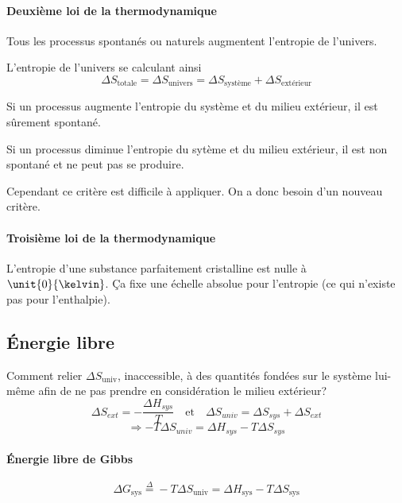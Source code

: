\documentclass[11pt,a4paper,french]{article}
\newcommand\eqdef{\stackrel{\Delta}{=}}
\begin{document}
\paragraph{Deuxième loi de la thermodynamique}
Tous les processus spontanés ou naturels augmentent l'entropie de l'univers.

L'entropie de l'univers se calculant ainsi
\[ \Delta S_\mathrm{totale} = \Delta S_\mathrm{univers} = \Delta S_{\textrm{système}} + \Delta S_{\textrm{extérieur}} \]

Si un processus augmente l'entropie du système et du milieu extérieur, il est sûrement spontané.

Si un processus diminue l'entropie du sytème et du milieu extérieur, il est non spontané et ne peut pas se produire.


Cependant ce critère est difficile à appliquer.
On a donc besoin d'un nouveau critère.

\paragraph{Troisième loi de la thermodynamique}
L'entropie d'une substance parfaitement cristalline est nulle à $\unit{0}{\kelvin}$.
\c{C}a fixe une échelle absolue pour l'entropie (ce qui n'existe pas pour l'enthalpie).



\subsection{\'Energie libre}
Comment relier $\Delta S_\mathrm{univ}$, inaccessible, à des quantités fondées sur le système lui-même afin de ne pas prendre en considération le milieu extérieur?
\[ \Delta S_{ext}=-\frac{\Delta H_{sys}}{T}
\quad\mathrm{et}\quad
\Delta S_{univ}=\Delta S_{sys}+\Delta S_{ext} \]
$$\Rightarrow -T\Delta S_{univ}=\Delta H_{sys}-T\Delta S_{sys}$$

\paragraph{\'Energie libre de Gibbs}
\[ \Delta G_\mathrm{sys} \eqdef -T\Delta S_\mathrm{univ} = \Delta H_\mathrm{sys} - T\Delta S_\mathrm{sys} \]
\end{document}
